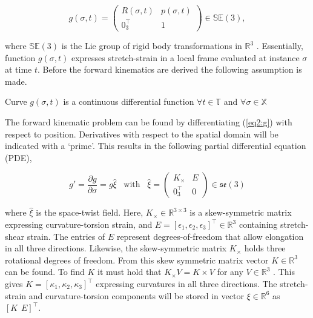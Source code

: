 \begin{equation}
    g(\sigma,t) = \begin{pmatrix}  R(\sigma,t) & p(\sigma,t) \\ 0_3^\top & 1 \end{pmatrix} \in \mathbb{SE}(3),
    \label{eq2:g}
\end{equation}

where $\mathbb{SE}(3)$ is the Lie group of rigid body transformations in $\mathbb{R}^3$ \cite{Sola2018}. Essentially, function $g(\sigma,t)$ expresses stretch-strain in a local frame evaluated at instance $\sigma$ at time $t$. Before the forward kinematics are derived the following assumption is made.

\begin{manualtheorem}{2.1}[]
Curve  $g(\sigma,t)$ is a continuous differential function $ \forall t \in 
\mathbb{T} $ and $\forall \sigma \in \mathbb{X}$
\end{manualtheorem}

The forward kinematic problem can be found by differentiating (\ref{eq2:g}) with respect to position.
Derivatives with respect to the spatial domain will be indicated with a `prime'. This results in the following partial differential equation (PDE), 




\begin{equation}
   g' = \frac{\partial g}{\partial \sigma} = g \hat{\xi} \hspace{10pt} \text{with} \hspace{10pt}  \hat{\xi} = \begin{pmatrix} K_\times & E \\ 0_3^\top & 0 \end{pmatrix} \in  \mathfrak{se}(3)
    \label{eq2:dgdsigma}
\end{equation}

where $\hat{\xi}$ is the space-twist field. Here, $K_\times \in \mathbb{R}^{3\times 3}$ is a skew-symmetric matrix expressing curvature-torsion strain, and $E = [\epsilon_1,\epsilon_2,\epsilon_3]^\top \in \mathbb{R}^3$ containing stretch-shear strain. The entries of $E$ represent degrees-of-freedom that allow elongation in all three directions. Likewise, the skew-symmetric matrix $K_{\times}$ holds three rotational degrees of freedom. From this skew symmetric matrix vector $K \in \mathbb{R}^3$ can be found. To find $K$ it must hold that $K_\times V = K \times V$ for any $V \in \mathbb{R}^3$ \cite{Boyer2019}. This gives $K = [\kappa_1,\kappa_2,\kappa_3]^\top$ expressing curvatures in all three directions. The stretch-strain and curvature-torsion components will be stored in vector $\xi \in \mathbb{R}^6$ as $[K \hspace{5pt} E]^\top$.

